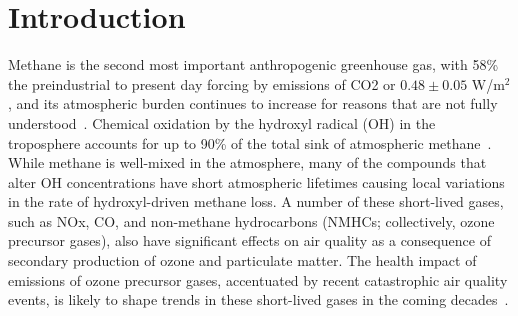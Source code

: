 \section{Introduction}



Methane is the second most important anthropogenic greenhouse gas, with 58\% the preindustrial to present day forcing by emissions of CO2 or $0.48 \pm 0.05$ W/m$^2$, and its atmospheric burden continues to increase for reasons that are not fully understood~\citep{ref:myhre2013}. Chemical oxidation by the hydroxyl radical (OH) in the troposphere accounts for up to 90\% of the total sink of atmospheric methane~\citep{ref:kirschke2013}. While methane is well-mixed in the atmosphere, many of the compounds that alter OH concentrations have short atmospheric lifetimes causing local variations in the rate of hydroxyl-driven methane loss. A number of these short-lived gases, such as NOx, CO, and non-methane hydrocarbons (NMHCs; collectively, ozone precursor gases), also have significant effects on air quality as a consequence of secondary production of ozone and particulate matter. The health impact of emissions of ozone precursor gases, accentuated by recent catastrophic air quality events, is likely to shape trends in these short-lived gases in the coming decades~\citep{ref:driscoll2015,ref:forouzanfar2015}.


